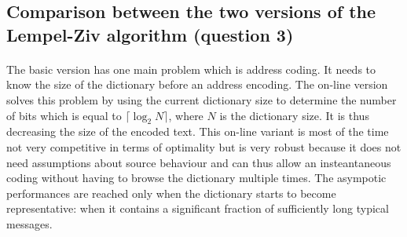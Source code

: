 \documentclass[a4paper, 11pt, oneside]{article}
\begin{document}
\subsection{Comparison between the two versions of the Lempel-Ziv algorithm (question 3)}
\paragraph{}The basic version has one main problem which is address coding. It needs to know the
size of the dictionary before an address encoding. The on-line version solves this problem by using the current dictionary size to determine the number of bits which is equal to $\lceil\log_2{N}\rceil$, where $N$ is the dictionary size. It is thus decreasing the size of the encoded text. This on-line variant is most of the time not very competitive in
terms of optimality but is very robust because it does not need assumptions about source behaviour and can thus allow an insteantaneous coding without having to browse the dictionary multiple times. The asympotic performances are reached only when the dictionary starts to become
representative: when it contains a significant fraction of sufficiently long typical messages.

\end{document}
